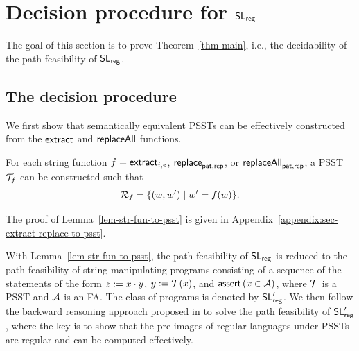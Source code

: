 
\section{Decision procedure for $\mathsf{SL}_{\sf reg}$} \label{sec:decision}

The goal of this section is to prove Theorem~\ref{thm-main}, i.e., the decidability of the path feasibility of $\mathsf{SL}_{\sf reg}$. 
%

\subsection{The decision procedure}

We first show that semantically equivalent PSSTs can be effectively constructed from the $\mathsf{extract}$ and $\mathsf{replaceAll}$ functions. 

\begin{lemma}\label{lem-str-fun-to-psst}
For each string function $f = \mathsf{extract}_{i,e}$, $\mathsf{replace}_{\mathsf{pat}, \mathsf{rep}}$, or $\mathsf{replaceAll}_{\mathsf{pat}, \mathsf{rep}}$, a PSST $\mathcal{T}_f$ can be constructed such that 
$$\mathcal{R}_{f} = \{(w, w') \mid w'= f(w)\}.$$
\end{lemma}

%
The proof of Lemma~\ref{lem-str-fun-to-psst} is given in Appendix~\ref{appendix:sec-extract-replace-to-psst}.

With Lemma~\ref{lem-str-fun-to-psst}, the path feasibility of $\mathsf{SL}_{\sf reg}$ is reduced to the path feasibility of string-manipulating programs consisting of  a sequence of the statements of the form $z:=x \cdot y$, $y:=\mathcal{T}(x)$, and $\textsf{assert}\left(x \in \mathcal{A}\right)$, where $\mathcal{T}$ is a PSST and $\mathcal{A}$ is an FA.  The class of programs is denoted by $\mathsf{SL}'_{\sf reg}$. We then  follow %
the backward reasoning approach proposed in \cite{CCH+18,CHL+19} to solve the path feasibility of $\mathsf{SL}'_{\sf reg}$, where the key is to show that the pre-images of regular languages  under PSSTs  are regular and can be computed effectively.

